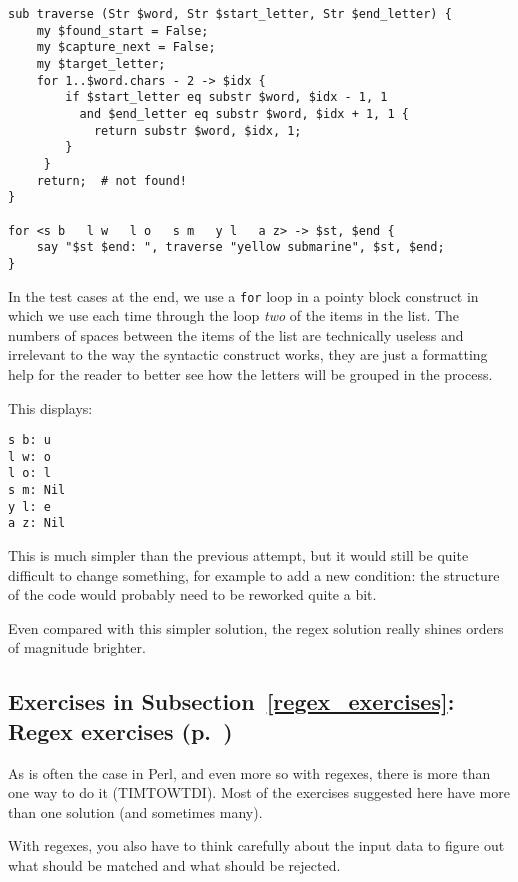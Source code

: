 \begin{verbatim}
sub traverse (Str $word, Str $start_letter, Str $end_letter) {
    my $found_start = False;
    my $capture_next = False;
    my $target_letter;
    for 1..$word.chars - 2 -> $idx {
        if $start_letter eq substr $word, $idx - 1, 1
          and $end_letter eq substr $word, $idx + 1, 1 {
            return substr $word, $idx, 1;
        }
     }
    return;  # not found!
}          

for <s b   l w   l o   s m   y l   a z> -> $st, $end {
    say "$st $end: ", traverse "yellow submarine", $st, $end;  
}
\end{verbatim}

In the test cases at the end, we use a {\tt for} loop in a 
pointy block construct in which we use each time through the 
loop \emph{two} of the items in the list. The numbers of 
spaces between the items of the list are technically useless 
and irrelevant to the 
way the syntactic construct works, they are just a formatting 
help for the reader to better see how the letters will 
be grouped in the process.

This displays:
\begin{verbatim}
s b: u
l w: o
l o: l
s m: Nil
y l: e
a z: Nil
\end{verbatim}

This is much simpler than the previous attempt, but it would 
still be quite difficult to change something, for example 
to add a new condition: the structure of the code would 
probably need to be reworked quite a bit.

Even compared with this simpler solution, the regex solution 
really shines orders of magnitude brighter.


\subsection{Exercises in Subsection~\ref{regex_exercises}: Regex exercises (p.~\pageref{regex_exercises})}
\label{sol_regex_exercises}

As is often the case in Perl, and even more so with 
regexes, there is more than one way to do it (TIMTOWTDI). 
Most of the exercises suggested here have more than one 
solution (and sometimes many).

With regexes, you also have to think carefully about the 
input data to figure out what should be matched and what 
should be rejected.

